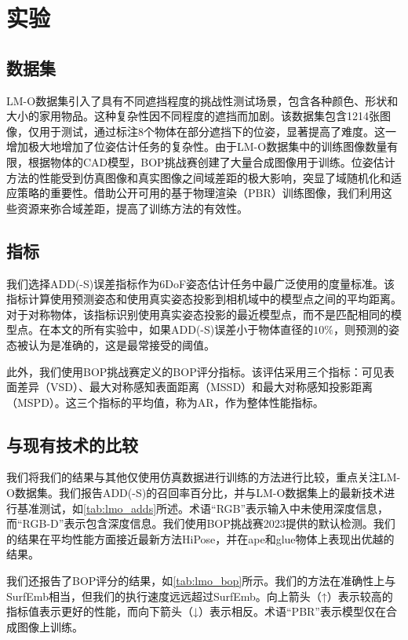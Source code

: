 \section{实验}

\subsection{数据集}
LM-O数据集\cite{lmo}引入了具有不同遮挡程度的挑战性测试场景，包含各种颜色、形状和大小的家用物品。这种复杂性因不同程度的遮挡而加剧。该数据集包含1214张图像，仅用于测试，通过标注8个物体在部分遮挡下的位姿，显著提高了难度。这一增加极大地增加了位姿估计任务的复杂性。由于LM-O数据集中的训练图像数量有限，根据物体的CAD模型，BOP挑战赛创建了大量合成图像用于训练。位姿估计方法的性能受到仿真图像和真实图像之间域差距的极大影响，突显了域随机化和适应策略的重要性。借助公开可用的基于物理渲染（PBR）训练图像\cite{hodan2024bop}，我们利用这些资源来弥合域差距，提高了训练方法的有效性。

\subsection{指标}
我们选择ADD(-S)误差指标作为6DoF姿态估计任务中最广泛使用的度量标准。该指标计算使用预测姿态和使用真实姿态投影到相机域中的模型点之间的平均距离。对于对称物体，该指标识别使用真实姿态投影的最近模型点，而不是匹配相同的模型点。在本文的所有实验中，如果ADD(-S)误差小于物体直径的$10\%$，则预测的姿态被认为是准确的，这是最常接受的阈值。

此外，我们使用BOP挑战赛定义的BOP评分指标\cite{hodan2024bop}。该评估采用三个指标：可见表面差异（VSD）、最大对称感知表面距离（MSSD）和最大对称感知投影距离（MSPD）。这三个指标的平均值，称为AR，作为整体性能指标。

\subsection{与现有技术的比较}

我们将我们的结果与其他仅使用仿真数据进行训练的方法进行比较，重点关注LM-O数据集\cite{lmo}。我们报告ADD(-S)的召回率百分比，并与LM-O数据集上的最新技术进行基准测试，如\autoref{tab:lmo_adds}所述。术语“RGB”表示输入中未使用深度信息，而“RGB-D”表示包含深度信息。我们使用BOP挑战赛2023\cite{hodan2024bop}提供的默认检测。我们的结果在平均性能方面接近最新方法HiPose，并在ape和glue物体上表现出优越的结果。



我们还报告了BOP评分的结果，如\autoref{tab:lmo_bop}所示。我们的方法在准确性上与SurfEmb\cite{haugaard2022surfemb}相当，但我们的执行速度远远超过SurfEmb。向上箭头（↑）表示较高的指标值表示更好的性能，而向下箭头（↓）表示相反。术语“PBR”表示模型仅在合成图像上训练。

